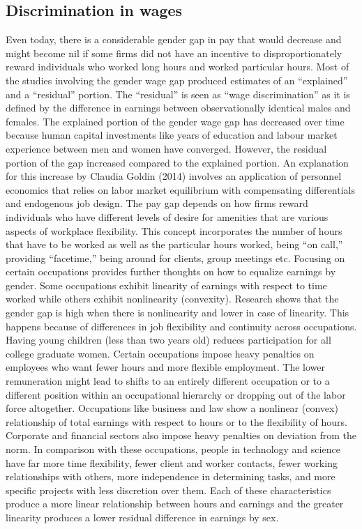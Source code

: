 \documentclass[12pt]{article}
\begin{document}
\subsection{Discrimination in wages}
Even today, there is a considerable gender gap in pay that would decrease and might become
nil if some firms did not have an incentive to disproportionately reward individuals who
worked long hours and worked particular hours. Most of the studies involving the gender
wage gap produced estimates of an “explained” and a “residual” portion. The “residual” is
seen as “wage discrimination” as it is defined by the difference in earnings between
observationally identical males and females. The explained portion of the gender wage gap
has decreased over time because human capital investments like years of education and
labour market experience between men and women have converged. However, the residual
portion of the gap increased compared to the explained portion. An explanation for this
increase by Claudia Goldin (2014) involves an application of personnel economics that
relies on labor market equilibrium with compensating differentials and endogenous job
design.
The pay gap depends on how firms reward individuals who have different levels of desire for
amenities that are various aspects of workplace flexibility. This concept incorporates the
number of hours that have to be worked as well as the particular hours worked, being “on
call,” providing “facetime,” being around for clients, group meetings etc.
Focusing on certain occupations provides further thoughts on how to equalize earnings by
gender. Some occupations exhibit linearity of earnings with respect to time worked while
others exhibit nonlinearity (convexity). Research shows that the gender gap is high when
there is nonlinearity and lower in case of linearity. This happens because of differences in job
flexibility and continuity across occupations. Having young children (less than two years old)
reduces participation for all college graduate women. Certain occupations impose heavy
penalties on employees who want fewer hours and more flexible employment. The lower
remuneration might lead to shifts to an entirely different occupation or to a different position
within an occupational hierarchy or dropping out of the labor force altogether. Occupations
like business and law show a nonlinear (convex) relationship of total earnings with respect to
hours or to the flexibility of hours. Corporate and financial sectors also impose heavy
penalties on deviation from the norm. In comparison with these occupations, people in
technology and science have far more time flexibility, fewer client and worker contacts,
fewer working relationships with others, more independence in determining tasks, and more
specific projects with less discretion over them. Each of these characteristics produce a more
linear relationship between hours and earnings and the greater linearity produces a lower
residual difference in earnings by sex.
\end{document}
